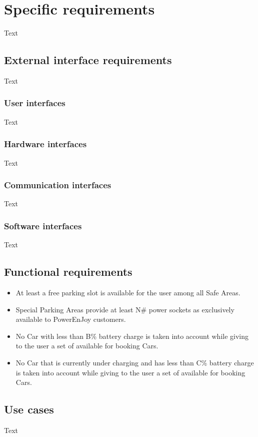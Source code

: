 \documentclass{article}
\begin{document}
\iffalse SECTION 4 \fi 
\section{Specific requirements}
Text
\subsection{External interface requirements}
Text
\subsubsection{User interfaces}
Text
\subsubsection{Hardware interfaces}
Text
\subsubsection{Communication interfaces}
Text
\subsubsection{Software interfaces}
Text
\subsection{Functional requirements}
\begin{itemize}
\item At least a free parking slot is available for the user among all Safe Areas.
\item Special Parking Areas provide at least N\# power sockets as exclusively available to PowerEnJoy customers.
\item No Car with less than B\% battery charge is taken into account while giving to the user a set of available for booking Cars.
\item No Car that is currently under charging and has less than C\% battery charge is taken into account while giving to the user a set of available for booking Cars.
\end{itemize}
\subsection{Use cases}
Text
\end{document}
